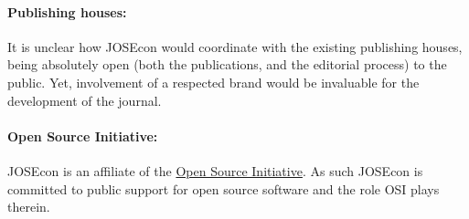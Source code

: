 \paragraph{Publishing houses:} 
It is unclear how JOSEcon would coordinate with the existing publishing houses, being
absolutely open (both the publications, and the editorial process) to the public.
Yet, involvement of a respected brand would be invaluable for the development of 
the journal.

\paragraph{Open Source Initiative:}
JOSEcon is an affiliate of the \href{https://opensource.org/}{Open Source Initiative}.
As such JOSEcon is committed to public support for open source software and the role OSI plays therein.



